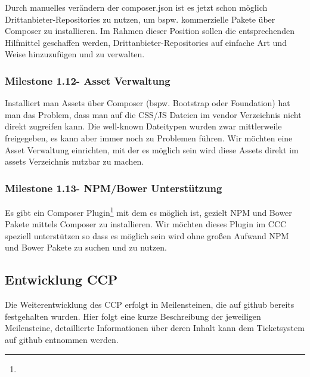 \documentclass[
paper=a4,
draft=false,%
fontsize=10pt%
]{scrartcl}
\begin{document}
Durch manuelles verändern der composer.json ist es jetzt schon möglich Drittanbieter-Repositories zu nutzen, um bspw. kommerzielle Pakete über Composer zu installieren. Im Rahmen dieser Position sollen die entsprechenden Hilfmittel geschaffen werden, Drittanbieter-Repositories auf einfache Art und Weise hinzuzufügen und zu verwalten.

\subsubsection[Milestone 1.12 - Asset Verwaltung]{Milestone 1.12\footnotemark - Asset Verwaltung}
\label{subsec:ccc-milestone-1.12}

Installiert man Assets über Composer (bspw. Bootstrap oder Foundation) hat man das Problem, dass man auf die CSS/JS Dateien im vendor Verzeichnis nicht direkt zugreifen kann. Die well-known Dateitypen wurden zwar mittlerweile freigegeben, es kann aber immer noch zu Problemen führen. Wir möchten eine Asset Verwaltung einrichten, mit der es möglich sein wird diese Assets direkt im assets Verzeichnis nutzbar zu machen.

\subsubsection[Milestone 1.13 - NPM/Bower Unterstützung]{Milestone 1.13\footnotemark - NPM/Bower Unterstützung}
\label{subsec:ccc-milestone-1.13}

Es gibt ein Composer Plugin\footnote{} mit dem es möglich ist, gezielt NPM und Bower Pakete mittels Composer zu installieren. Wir möchten dieses Plugin im CCC speziell unterstützen so dass es möglich sein wird ohne großen Aufwand NPM und Bower Pakete zu suchen und zu nutzen.

\pagebreak

\subsection{Entwicklung CCP}
\label{subsec:ccp}

Die Weiterentwicklung des CCP erfolgt in Meilensteinen, die auf github bereits festgehalten wurden. Hier folgt eine kurze Beschreibung der jeweiligen Meilensteine, detaillierte Informationen über deren Inhalt kann dem Ticketsystem auf github entnommen werden.
\end{document}
